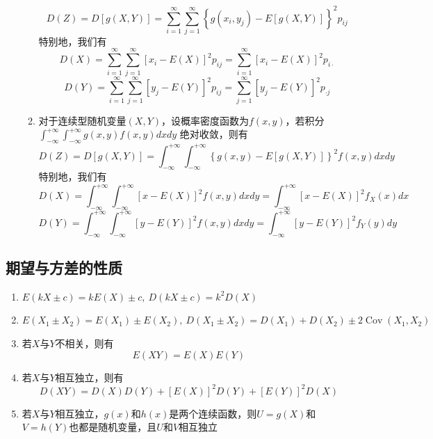 \documentclass[12pt,a4paper,UTF8]{book}
\begin{document}
\begin{enumerate}
\begin{enumerate}
\[D\left(Z\right)=D\left[g\left(X,Y\right)\right]=\sum\limits_{i=1}^{\infty}\sum\limits_{j=1}^{\infty}\left\{g\left(x_i,y_j\right)-E\left[g\left(X,Y\right)\right]\right\}^2p_{ij}\]
特别地，我们有
\[D\left(X\right)=\sum\limits_{i=1}^{\infty}\sum\limits_{j=1}^{\infty}\left[x_i-E\left(X\right)\right]^2p_{ij}=\sum\limits_{i=1}^{\infty}\left[x_i-E\left(X\right)\right]^2p_{i\cdot}\]
\[D\left(Y\right)=\sum\limits_{i=1}^{\infty}\sum\limits_{j=1}^{\infty}\left[y_j-E\left(Y\right)\right]^2p_{ij}=\sum\limits_{j=1}^{\infty}\left[y_j-E\left(Y\right)\right]^2p_{\cdot j}\]
\item 对于连续型随机变量$\left(X,Y\right)$，设概率密度函数为$f\left(x,y\right)$，若积分$\int_{-\infty}^{+\infty}\int_{-\infty}^{+\infty}g\left(x,y\right)f\left(x,y\right)dxdy$ 绝对收敛，则有
\[D\left(Z\right)=D\left[g\left(X,Y\right)\right]=\int_{-\infty}^{+\infty}\int_{-\infty}^{+\infty}\left\{g\left(x,y\right)-E\left[g\left(X,Y\right)\right]\right\}^2f\left(x,y\right)dxdy\]
特别地，我们有
\[D\left(X\right)=\int_{-\infty}^{+\infty}\int_{-\infty}^{+\infty}\left[x-E\left(X\right)\right]^2f\left(x,y\right)dxdy=\int_{-\infty}^{+\infty}\left[x-E\left(X\right)\right]^2f_X\left(x\right)dx\]
\[D\left(Y\right)=\int_{-\infty}^{+\infty}\int_{-\infty}^{+\infty}\left[y-E\left(Y\right)\right]^2f\left(x,y\right)dxdy=\int_{-\infty}^{+\infty}\left[y-E\left(Y\right)\right]^2f_Y\left(y\right)dy\]
\end{enumerate}
\end{enumerate}

\subsection{期望与方差的性质}
\begin{enumerate}
\item $E\left(kX\pm c\right)=kE\left(X\right)\pm c,\ D\left(kX\pm c\right)=k^2D\left(X\right)$
\item $E\left(X_1\pm X_2\right)=E\left(X_1\right)\pm E\left(X_2\right),\ D\left(X_1\pm X_2\right)=D\left(X_1\right)+D\left(X_2\right)\pm2\operatorname{Cov}\left(X_1,X_2\right)$
\item 若$X$与$Y$不相关，则有
\[E\left(XY\right)=E\left(X\right)E\left(Y\right)\]
\item 若$X$与$Y$相互独立，则有
\[D\left(XY\right)=D\left(X\right)D\left(Y\right)+\left[E\left(X\right)\right]^2D\left(Y\right)+\left[E\left(Y\right)\right]^2D\left(X\right)\]
\item 若$X$与$Y$相互独立，$g\left(x\right)$和$h\left(x\right)$是两个连续函数，则$U=g\left(X\right)$和$V=h\left(Y\right)$也都是随机变量，且$U$和$V$相互独立
\end{enumerate}
\end{document}
